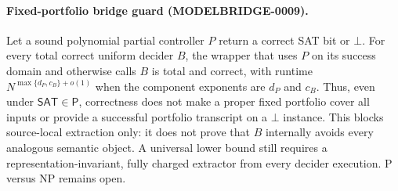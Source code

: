 \paragraph{Fixed-portfolio bridge guard (MODELBRIDGE-0009).}
Let a sound polynomial partial controller $P$ return a correct SAT bit or
$\bot$.  For every total correct uniform decider $B$, the wrapper that uses
$P$ on its success domain and otherwise calls $B$ is total and correct, with
runtime $N^{\max\{d_P,c_B\}+o(1)}$ when the component exponents are $d_P$ and
$c_B$.  Thus, even under $\mathsf{SAT}\in\mathsf P$, correctness does not make
a proper fixed portfolio cover all inputs or provide a successful portfolio
transcript on a $\bot$ instance.  This blocks source-local extraction only:
it does not prove that $B$ internally avoids every analogous semantic object.
A universal lower bound still requires a representation-invariant, fully
charged extractor from every decider execution.  P versus NP remains open.
